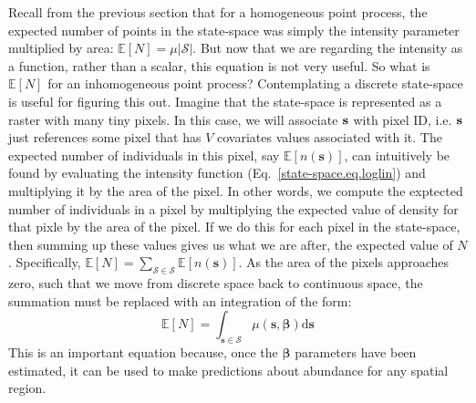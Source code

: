 Recall from the previous section that for a homogeneous point process,
the expected number of points in the state-space was simply the
intensity parameter multiplied by area: $\mathbb{E}[N] =
\mu|\mathcal{S}|$. But now that we are regarding the intensity as a
function, rather than a scalar, this equation is not very useful. So
what is $\mathbb{E}[N]$ for an inhomogeneous point process?
Contemplating a discrete state-space is useful for figuring this
out. Imagine that the state-space is represented as a raster with many
tiny pixels. In this case, we will associate
$\bf s$ with pixel ID, i.e. $\bf s$ just references some pixel that
has $V$ covariates values associated with it. The expected number of
individuals in this pixel, say $\mathbb{E}[n(\mathbf{s})]$, can intuitively be
found by evaluating the intensity function
(Eq.~\ref{state-space.eq.loglin}) and multiplying it by the area of
the pixel. In other words, we compute the exptected number of
individuals in a pixel by multiplying the expected value of density
for that pixle by the area of the pixel. If we do this for each pixel in the state-space, then
summing up these values gives us what we are after, the expected value
of $N$. Specifically,
$\mathbb{E}[N] = \sum_{\mathcal{S} \in \mathcal{S}} \mathbb{E}[n(\mathbf{s})]$.
As the area of the pixels approaches zero, such that we move from discrete
space back to continuous space, the summation must be replaced
with an integration of the form:
\begin{equation}
\mathbb{E}[N] = \int_{\mathbf{s} \in \mathcal{S}} \mu(\mathbf{s}, {\bm \beta}) \mathrm{d}\mathbf{s}
\label{state-space.eq.EN}
\end{equation}
This is an important equation because, once the $\bm \beta$ parameters
have been estimated, it can be used to make predictions
about abundance for any spatial region.

